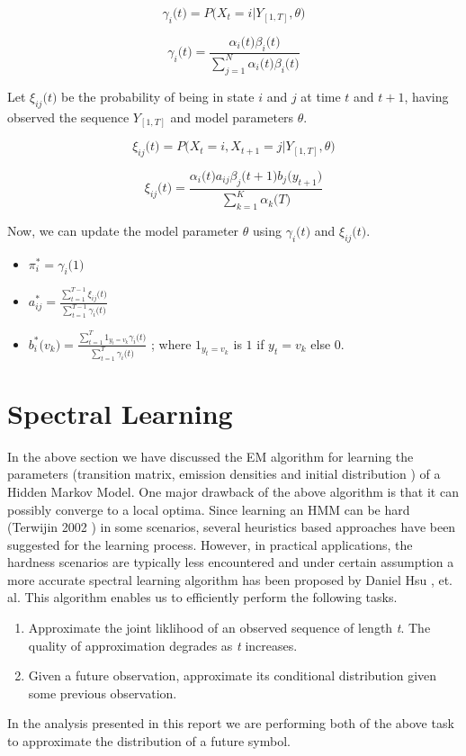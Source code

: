 \documentclass{article} %
\begin{document}
\[\gamma_i\big(t\big) = P\big( X_t=i|Y_{[1,T]},\theta\big)\]


\[\gamma_i\big(t\big) = \frac{\alpha_i\big(t\big) \beta_i\big(t\big)}{\sum_{j=1}^N \alpha_i\big(t\big) \beta_i\big(t\big) }\]

Let $\xi_{ij}\big(t\big)$ be the probability of being in state $i$ and $j$ at time $t$ and $t+1$, having observed the sequence $Y_{[1,T]}$ and model parameters $\theta$.

\[\xi_{ij}\big(t\big) = P\big( X_t=i,X_{t+1}=j|Y_{[1,T]},\theta\big)\]

\[\xi_{ij}\big(t\big) = \frac{\alpha_i\big(t\big)a_{ij}\beta_j\big(t+1\big)b_j\big(y_{t+1}\big)}{\sum_{k=1}^K \alpha_k\big(T\big)}\]

Now, we can update the model parameter $\theta$ using $\gamma_i\big(t\big)$ and $\xi_{ij}\big(t\big)$.
\begin{itemize}
\item \( \pi_i^* = \gamma_i\big(1\big) \)	
\item \( a_{ij}^* = \frac{\sum_{t=1}^{T-1}\xi_{ij}\big(t\big)}{\sum_{t=1}^{T-1}\gamma_{i}\big(t\big)} \)
\item \( b_i^*\big( v_k \big) = \frac{\sum_{t=1}^{T}1_{y_t=v_k}\gamma_{i}\big(t\big)}{\sum_{t=1}^{T}\gamma_{i}\big(t\big)}\)
;  where $1_{y_t=v_k}$ is $1$ if $y_t=v_k$ else $0$.
\end{itemize}

\section{Spectral Learning}
\label{Spectral Learning}

In the above section we have discussed the EM algorithm for learning the parameters (transition matrix, emission densities and initial distribution ) of a Hidden Markov Model. One major drawback of the above algorithm is that it can possibly converge to a local optima. Since learning an HMM can be hard (Terwijin 2002 ) in some scenarios, several heuristics based approaches have been suggested for the learning process. However, in practical applications, the hardness scenarios are typically less encountered and under certain assumption a more accurate spectral learning algorithm has been proposed by Daniel Hsu , et. al.  This algorithm enables us to efficiently perform the following tasks.
\begin{enumerate}
	\item Approximate the joint liklihood of an observed sequence of length \textit{t}. The quality of approximation degrades as \textit{t} increases.
	\item Given a future observation, approximate its conditional distribution given some previous observation. 
\end{enumerate}
In the analysis presented in this report we are performing both of the above task to approximate the distribution of a future symbol.
\end{document}
